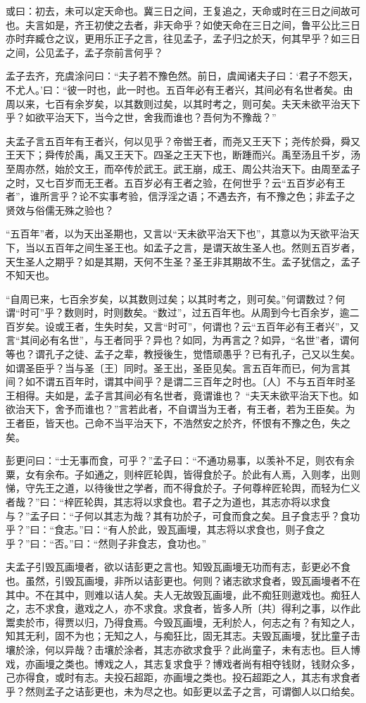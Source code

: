 \documentclass[]{article}
\begin{document}
或曰：初去，未可以定天命也。冀三日之间，王复追之，天命或时在三日之间故可也。夫言如是，齐王初使之去者，非天命乎？如使天命在三日之间，鲁平公比三日亦时弃臧仓之议，更用乐正子之言，往见孟子，孟子归之於天，何其早乎？如三日之间，公见孟子，孟子奈前言何乎？

孟子去齐，充虞涂问曰：``夫子若不豫色然。前日，虞闻诸夫子曰：`君子不怨天，不尤人。'曰：``彼一时也，此一时也。五百年必有王者兴，其间必有名世者矣。由周以来，七百有余岁矣，以其数则过矣，以其时考之，则可矣。夫天未欲平治天下乎？如欲平治天下，当今之世，舍我而谁也？吾何为不豫哉？''

夫孟子言五百年有王者兴，何以见乎？帝喾王者，而尧又王天下；尧传於舜，舜又王天下；舜传於禹，禹又王天下。四圣之王天下也，断踵而兴。禹至汤且千岁，汤至周亦然，始於文王，而卒传於武王。武王崩，成王、周公共治天下。由周至孟子之时，又七百岁而无王者。五百岁必有王者之验，在何世乎？云``五百岁必有王者''，谁所言乎？论不实事考验，信浮淫之语；不遇去齐，有不豫之色；非孟子之贤效与俗儒无殊之验也？

``五百年''者，以为天出圣期也，又言以``天未欲平治天下也''，其意以为天欲平治天下，当以五百年之间生圣王也。如孟子之言，是谓天故生圣人也。然则五百岁者，天生圣人之期乎？如是其期，天何不生圣？圣王非其期故不生。孟子犹信之，孟子不知天也。

``自周已来，七百余岁矣，以其数则过矣；以其时考之，则可矣。''何谓数过？何谓``时可''乎？数则时，时则数矣。``数过''，过五百年也。从周到今七百余岁，逾二百岁矣。设或王者，生失时矣，又言``时可''，何谓也？云``五百年必有王者兴''，又言``其间必有名世''，与王者同乎？异也？如同，为再言之？如异，``名世''者，谓何等也？谓孔子之徒、孟子之辈，教授後生，觉悟顽愚乎？已有孔子，己又以生矣。如谓圣臣乎？当与圣〔王〕同时。圣王出，圣臣见矣。言五百年而已，何为言其间？如不谓五百年时，谓其中间乎？是谓二三百年之时也。〔人〕不与五百年时圣王相得。夫如是，孟子言其间必有名世者，竟谓谁也？
``夫天未欲平治天下也。如欲治天下，舍予而谁也？''言若此者，不自谓当为王者，有王者，若为王臣矣。为王者臣，皆天也。己命不当平治天下，不浩然安之於齐，怀恨有不豫之色，失之矣。

彭更问曰：``士无事而食，可乎？''孟子曰：``不通功易事，以羡补不足，则农有余粟，女有余布。子如通之，则梓匠轮舆，皆得食於子。於此有人焉，入则孝，出则悌，守先王之道，以待後世之学者，而不得食於子。子何尊梓匠轮舆，而轻为仁义者哉？''曰：``梓匠轮舆，其志将以求食也。君子之为道也，其志亦将以求食与？''孟子曰：``子何以其志为哉？其有功於子，可食而食之矣。且子食志乎？食功乎？''曰：``食志。''曰：``有人於此，毁瓦画墁，其志将以求食也，则子食之乎？''曰：``否。''曰：``然则子非食志，食功也。''

夫孟子引毁瓦画墁者，欲以诘彭更之言也。知毁瓦画墁无功而有志，彭更必不食也。虽然，引毁瓦画墁，非所以诘彭更也。何则？诸志欲求食者，毁瓦画墁者不在其中。不在其中，则难以诘人矣。夫人无故毁瓦画墁，此不痴狂则遨戏也。痴狂人之，志不求食，遨戏之人，亦不求食。求食者，皆多人所〔共〕得利之事，以作此鬻卖於市，得贾以归，乃得食焉。今毁瓦画墁，无利於人，何志之有？有知之人，知其无利，固不为也；无知之人，与痴狂比，固无其志。夫毁瓦画墁，犹比童子击壤於涂，何以异哉？击壤於涂者，其志亦欲求食乎？此尚童子，未有志也。巨人博戏，亦画墁之类也。博戏之人，其志复求食乎？博戏者尚有相夺钱财，钱财众多，己亦得食，或时有志。夫投石超距，亦画墁之类也。投石超距之人，其志有求食者乎？然则孟子之诘彭更也，未为尽之也。如彭更以孟子之言，可谓御人以口给矣。
\end{document}
